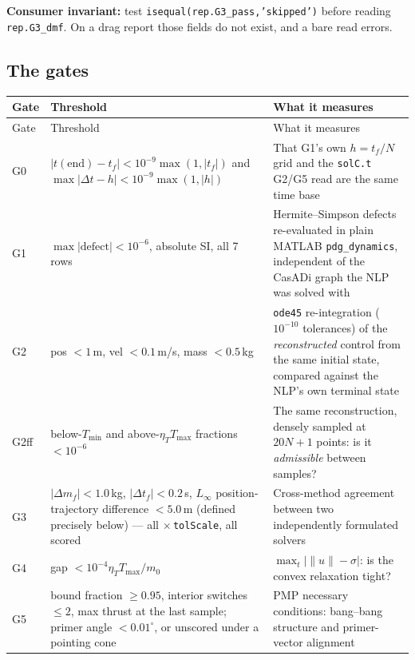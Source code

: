 \documentclass[11pt]{article}
\newcommand{\Tmin}{T_{\min}}
\newcommand{\Tmax}{T_{\max}}
\newcommand{\etaT}{\eta_T}
\begin{document}
\textbf{Consumer invariant:} test \texttt{isequal(rep.G3\_pass,'skipped')}
before reading \texttt{rep.G3\_dmf}. On a drag report those fields do not
exist, and a bare read errors.

\subsection{The gates}

\begin{center}
\begin{longtable}{@{}lL{5.0cm}L{5.1cm}@{}}
\toprule
Gate & Threshold & What it measures \\
\midrule
\endfirsthead
\toprule
Gate & Threshold & What it measures \\
\midrule
\endhead
G0 & $|t(\text{end})-t_f| < 10^{-9}\max(1,|t_f|)$ and
$\max|\Delta t - h| < 10^{-9}\max(1,|h|)$ &
That G1's own $h = t_f/N$ grid and the \texttt{solC.t} G2/G5 read are the
same time base \\
G1 & $\max|\text{defect}| < 10^{-6}$, absolute SI, all 7 rows &
Hermite--Simpson defects re-evaluated in plain MATLAB
\texttt{pdg\_dynamics}, independent of the CasADi graph the NLP was solved
with \\
G2 & pos $<1$\,m, vel $<0.1$\,m/s, mass $<0.5$\,kg &
\texttt{ode45} re-integration ($10^{-10}$ tolerances) of the
\emph{reconstructed} control from the same initial state, compared against
the NLP's own terminal state \\
G2ff & below-$\Tmin$ and above-$\etaT\Tmax$ fractions $<10^{-6}$ &
The same reconstruction, densely sampled at $20N+1$ points: is it
\emph{admissible} between samples? \\
G3 & $|\Delta m_f| < 1.0\,$kg, $|\Delta t_f| < 0.2$\,s,
$L_\infty$ position-trajectory difference $< 5.0$\,m (defined precisely
below) --- all $\times$\,\texttt{tolScale}, all scored &
Cross-method agreement between two independently formulated solvers \\
G4 & gap $< 10^{-4}\etaT\Tmax/m_0$ &
$\max_t\lvert\lVert u\rVert-\sigma\rvert$: is the convex relaxation tight? \\
G5 & bound fraction $\ge 0.95$, interior switches $\le 2$, max thrust at
the last sample; primer angle $<0.01^\circ$, or unscored under a pointing
cone &
PMP necessary conditions: bang--bang structure and primer-vector alignment \\
\bottomrule
\end{longtable}
\end{center}
\end{document}
